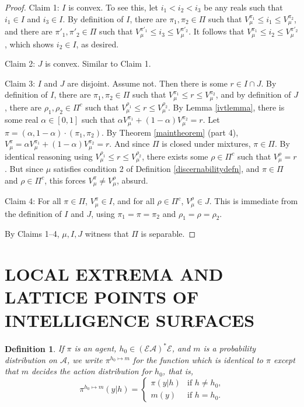 \documentclass[twoside]{article}
\newtheorem{definition}[theorem]{Definition}
\begin{document}
\begin{proof}
    Claim 1: $I$ is convex. To see this, let $i_1<i_2<i_3$ be any reals
    such that $i_1\in I$ and $i_3\in I$.
    By definition of $I$, there are $\pi_1,\pi_2\in\Pi$
    such that $V^{\pi_1}_\mu\leq i_1\leq V^{\pi_2}_\mu$,
    and there are $\pi'_1,\pi'_2\in\Pi$ such that
    $V^{\pi'_1}_\mu\leq i_3\leq V^{\pi'_2}_\mu$.
    It follows that $V^{\pi_1}_\mu\leq i_2\leq V^{\pi'_2}_\mu$,
    which shows $i_2\in I$, as desired.

    Claim 2: $J$ is convex. Similar to Claim 1.

    Claim 3: $I$ and $J$ are disjoint. Assume not. Then there is some $r\in I\cap J$.
    By definition of $I$, there are $\pi_1,\pi_2\in\Pi$ such that
    $V^{\pi_1}_\mu\leq r\leq V^{\pi_2}_\mu$, and by definition of $J$,
    there are $\rho_1,\rho_2\in\Pi^c$ such that $V^{\rho_1}_\mu\leq r\leq V^{\rho_2}_\mu$.
    By Lemma \ref{ivtlemma}, there is some real $\alpha\in [0,1]$
    such that $\alpha V^{\pi_1}_\mu + (1-\alpha)V^{\pi_2}_\mu=r$.
    Let $\pi=(\alpha,1-\alpha)\cdot (\pi_1,\pi_2)$.
    By Theorem \ref{maintheorem} (part 4),
    $V^\pi_\mu = \alpha V^{\pi_1}_\mu + (1-\alpha)V^{\pi_2}_\mu=r$.
    And since $\Pi$ is closed under mixtures, $\pi\in\Pi$.
    By identical reasoning using $V^{\rho_1}_\mu\leq r\leq V^{\rho_2}_\mu$,
    there exists some $\rho\in \Pi^c$ such that $V^\rho_\mu=r$.
    But since $\mu$ satisfies condition 2 of
    Definition \ref{discernabilitydefn}, 
    and $\pi\in\Pi$ and $\rho\in\Pi^c$, this forces
    $V^\pi_\mu\not=V^\rho_\mu$, absurd.

    Claim 4: For all $\pi\in \Pi$, $V^\pi_\mu\in I$, and for all $\rho\in\Pi^c$,
    $V^\rho_\mu\in J$. This is immediate from the definition of $I$ and $J$,
    using $\pi_1=\pi=\pi_2$ and $\rho_1=\rho=\rho_2$.

    By Claims 1--4, $\mu,I,J$ witness that $\Pi$ is separable.
\end{proof}

\section{LOCAL EXTREMA AND LATTICE POINTS OF INTELLIGENCE SURFACES}

\begin{definition}
\label{modifyagentatoneplace}
    If $\pi$ is an agent, $h_0\in(\mathcal E\mathcal A)^*\mathcal E$,
    and $m$ is a probability distribution on $\mathcal A$,
    we write $\pi^{h_0\mapsto m}$ for the function which is identical to $\pi$
    except that $m$ decides the action distribution for
    $h_0$, that is,
    \[
        \pi^{h_0\mapsto m}(y|h)
        =
        \begin{cases}
            \pi(y|h) &\mbox{if $h\not=h_0$,}\\
            m(y) &\mbox{if $h=h_0$.}
        \end{cases}
    \]
\end{definition}
\end{document}
